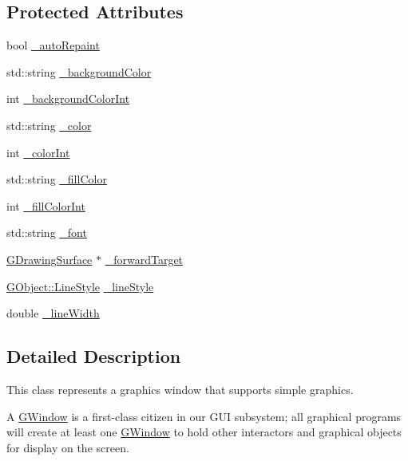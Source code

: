 \subsection*{Protected Attributes}
\begin{DoxyCompactItemize}
\item 
bool \mbox{\hyperlink{classGDrawingSurface_a738dd6afc69ac536ad46cf4d89a90933}{\+\_\+auto\+Repaint}}
\item 
std\+::string \mbox{\hyperlink{classGDrawingSurface_ad233544ea51cf6b435a199f3e3790607}{\+\_\+background\+Color}}
\item 
int \mbox{\hyperlink{classGDrawingSurface_abb8452ab4f23ecf455b9e021bf09ef91}{\+\_\+background\+Color\+Int}}
\item 
std\+::string \mbox{\hyperlink{classGDrawingSurface_a1134e770ae4315ea8bc1201e2f21da8b}{\+\_\+color}}
\item 
int \mbox{\hyperlink{classGDrawingSurface_a003fdd343d9b7505c53a8b7a134200ed}{\+\_\+color\+Int}}
\item 
std\+::string \mbox{\hyperlink{classGDrawingSurface_a179f8d6cee65cd8a54692e32b224392a}{\+\_\+fill\+Color}}
\item 
int \mbox{\hyperlink{classGDrawingSurface_a751def333a67d651e5b99cc331ecb496}{\+\_\+fill\+Color\+Int}}
\item 
std\+::string \mbox{\hyperlink{classGDrawingSurface_aea76ea1a8b5dd7b0a78653277e63b536}{\+\_\+font}}
\item 
\mbox{\hyperlink{classGDrawingSurface}{G\+Drawing\+Surface}} $\ast$ \mbox{\hyperlink{classGDrawingSurface_acbb02fa2a4a51a450fd1cc64dfc39ddd}{\+\_\+forward\+Target}}
\item 
\mbox{\hyperlink{classGObject_a86e0f5648542856159bb40775c854aa7}{G\+Object\+::\+Line\+Style}} \mbox{\hyperlink{classGDrawingSurface_ae15d02c66691247a6824dc5943a620e2}{\+\_\+line\+Style}}
\item 
double \mbox{\hyperlink{classGDrawingSurface_a16e9033665937f13de2e163dc2184aff}{\+\_\+line\+Width}}
\end{DoxyCompactItemize}


\subsection{Detailed Description}
This class represents a graphics window that supports simple graphics. 

A \mbox{\hyperlink{classGWindow}{G\+Window}} is a first-\/class citizen in our G\+UI subsystem; all graphical programs will create at least one \mbox{\hyperlink{classGWindow}{G\+Window}} to hold other interactors and graphical objects for display on the screen.

